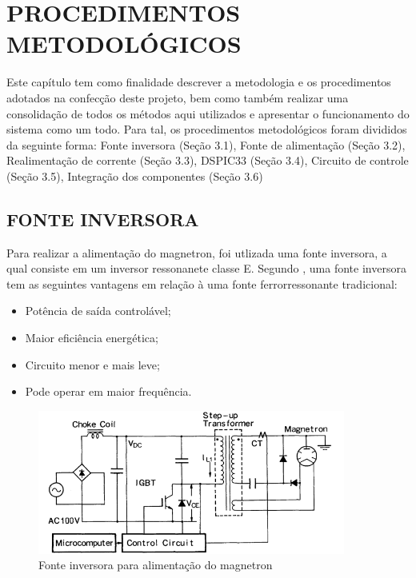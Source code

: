 \chapter{PROCEDIMENTOS METODOLÓGICOS}
\label{chap:metodologia}

Este capítulo tem como finalidade descrever a metodologia e os procedimentos adotados na confecção deste projeto, bem como também realizar uma consolidação de todos os métodos aqui utilizados e apresentar o funcionamento do sistema como um todo. Para tal, os procedimentos metodológicos foram divididos da seguinte forma: Fonte inversora (Seção 3.1), Fonte de alimentação (Seção 3.2),  Realimentação de corrente (Seção 3.3), DSPIC33  (Seção 3.4), Circuito de controle (Seção 3.5), Integração dos componentes (Seção 3.6)

\section{FONTE INVERSORA}
\label{sec:fonteInversora}

Para realizar a alimentação do magnetron, foi utlizada uma fonte inversora, a qual consiste em um inversor ressonanete classe E. Segundo , uma fonte inversora tem as seguintes vantagens em relação à uma fonte ferrorressonante tradicional:
\begin{itemize}
    \item Potência de saída controlável;
    \item Maior eficiência energética;
    \item Circuito menor e mais leve;
    \item Pode operar em maior frequência.
\end{itemize} 

\begin{figure}[!htb]
    \centering
    \includegraphics[width=0.9\textwidth]{./dados/figuras/font_inverter}
    \caption{Fonte inversora para alimentação do magnetron}
    \label{fig:figura-inverter}
\end{figure}

